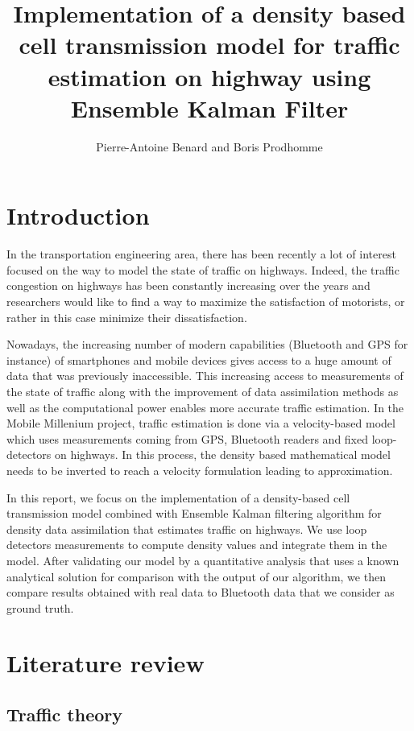 \documentclass[letterpaper,10pt]{article}
\author{Pierre-Antoine Benard and Boris Prodhomme}
\title{Implementation of a density based cell transmission model for traffic estimation on highway using Ensemble Kalman Filter}
\begin{document}
\maketitle

\newpage
\section*{Introduction}
In the transportation engineering area, there has been recently a lot of interest focused on the way to model the state of traffic on highways. Indeed, the traffic congestion on highways has been constantly increasing over the years and  researchers would like to find a way to maximize the satisfaction of motorists, or rather in this case minimize their dissatisfaction. 

\bigskip
Nowadays, the increasing number of modern capabilities (Bluetooth and GPS for instance) of smartphones and mobile devices gives access to a huge amount of data that was previously inaccessible. This increasing access to measurements of the state of traffic along with the improvement of data assimilation methods as well as the computational power enables more accurate traffic estimation. In the Mobile Millenium project, traffic estimation is done via a velocity-based model which uses measurements coming from GPS, Bluetooth readers and fixed loop-detectors on highways. In this process, the density based mathematical model needs to be inverted to reach a velocity formulation leading to approximation. 

\bigskip
In this report, we focus on the implementation of a density-based cell transmission model combined with Ensemble Kalman filtering algorithm for density data assimilation that estimates traffic on highways. We use loop detectors measurements to compute density values and integrate them in the model. After validating our model by a quantitative analysis that uses a known analytical solution for comparison with the output of our algorithm, we then compare results obtained with real data to Bluetooth data that we consider as ground truth.

\newpage

\tableofcontents

\newpage

\listoffigures

\newpage
\section{Literature review}
\subsection{Traffic theory}
\end{document}

